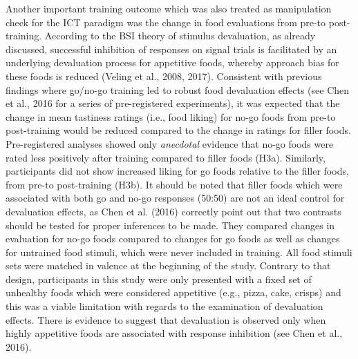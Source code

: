 \documentclass[man,floatsintext]{apa6}
\begin{document}
Another important training outcome which was also treated as manipulation check for the ICT paradigm was the change in food evaluations from pre-to post-training. According to the BSI theory of stimulus devaluation, as already discussed, successful inhibition of responses on signal trials is facilitated by an underlying devaluation process for appetitive foods, whereby approach bias for these foods is reduced (Veling et al., 2008, 2017). Consistent with previous findings where go/no-go training led to robust food devaluation effects (see Chen et al., 2016 for a series of pre-registered experiments), it was expected that the change in mean tastiness ratings (i.e., food liking) for no-go foods from pre-to post-training would be reduced compared to the change in ratings for filler foods. Pre-registered analyses showed only \emph{anecdotal} evidence that no-go foods were rated less positively after training compared to filler foods (H3a). Similarly, participants did not show increased liking for go foods relative to the filler foods, from pre-to post-training (H3b). It should be noted that filler foods which were associated with both go and no-go responses (50:50) are not an ideal control for devaluation effects, as Chen et al. (2016) correctly point out that two contrasts should be tested for proper inferences to be made. They compared changes in evaluation for no-go foods compared to changes for go foods as well as changes for untrained food stimuli, which were never included in training. All food stimuli sets were matched in valence at the beginning of the study. Contrary to that design, participants in this study were only presented with a fixed set of unhealthy foods which were considered appetitive (e.g., pizza, cake, crisps) and this was a viable limitation with regards to the examination of devaluation effects. There is evidence to suggest that devaluation is observed only when highly appetitive foods are associated with response inhibition (see Chen et al., 2016).

\par
\end{document}
